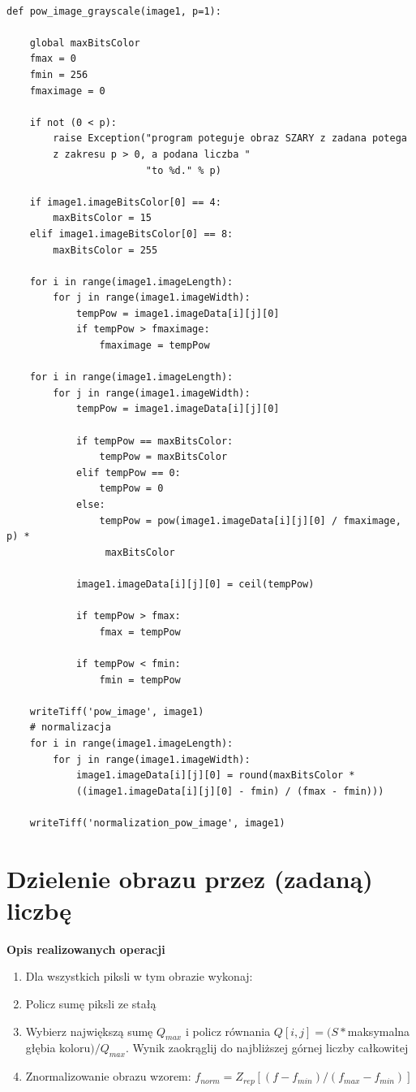 \documentclass[magisterska,openany]{pracadypl}
\begin{document}
\lstset{language=Python}
\vspace{0.25cm}
\begin{lstlisting}[caption={Potęgowanie obrazu}]

def pow_image_grayscale(image1, p=1):

    global maxBitsColor
    fmax = 0
    fmin = 256
    fmaximage = 0

    if not (0 < p):
        raise Exception("program poteguje obraz SZARY z zadana potega 
        z zakresu p > 0, a podana liczba "
                        "to %d." % p)

    if image1.imageBitsColor[0] == 4:
        maxBitsColor = 15
    elif image1.imageBitsColor[0] == 8:
        maxBitsColor = 255

    for i in range(image1.imageLength):
        for j in range(image1.imageWidth):
            tempPow = image1.imageData[i][j][0]
            if tempPow > fmaximage:
                fmaximage = tempPow

    for i in range(image1.imageLength):
        for j in range(image1.imageWidth):
            tempPow = image1.imageData[i][j][0]

            if tempPow == maxBitsColor:
                tempPow = maxBitsColor
            elif tempPow == 0:
                tempPow = 0
            else:
                tempPow = pow(image1.imageData[i][j][0] / fmaximage, p) *
                 maxBitsColor

            image1.imageData[i][j][0] = ceil(tempPow)

            if tempPow > fmax:
                fmax = tempPow

            if tempPow < fmin:
                fmin = tempPow

    writeTiff('pow_image', image1)
    # normalizacja
    for i in range(image1.imageLength):
        for j in range(image1.imageWidth):
            image1.imageData[i][j][0] = round(maxBitsColor * 
            ((image1.imageData[i][j][0] - fmin) / (fmax - fmin)))

    writeTiff('normalization_pow_image', image1)

\end{lstlisting}


\newpage
\section{Dzielenie obrazu przez (zadaną) liczbę}

\textbf{\Large Opis realizowanych operacji}
\begin{enumerate}
\item Dla wszystkich piksli w tym obrazie wykonaj:
\item Policz sumę piksli ze stałą
\item Wybierz największą sumę $Q_{max}$ i policz równania $Q[i,j]=(S*$maksymalna głębia koloru$)/Q_{max}$. Wynik zaokrąglij do najbliższej górnej liczby całkowitej
\item Znormalizowanie obrazu wzorem:
\newline $f_{norm}=Z_{rep}[(f-f_{min})/(f_{max}-f_{min})]$
\end{enumerate}
\end{document}
